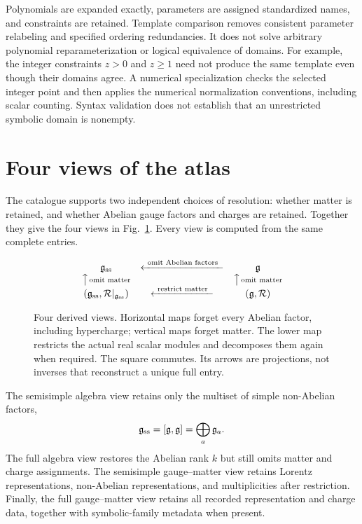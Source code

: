 Polynomials are expanded exactly, parameters are assigned standardized names, and constraints are retained. Template comparison removes consistent parameter relabeling and specified ordering redundancies. It does not solve arbitrary polynomial reparameterization or logical equivalence of domains. For example, the integer constraints $z>0$ and $z\geq1$ need not produce the same template even though their domains agree. A numerical specialization checks the selected integer point and then applies the numerical normalization conventions, including scalar counting. Syntax validation does not establish that an unrestricted symbolic domain is nonempty.

\section{Four views of the atlas}
\label{sec:views}

The catalogue supports two independent choices of resolution: whether matter is retained, and whether Abelian gauge factors and charges are retained. Together they give the four views in Fig.~\ref{fig:views}. Every view is computed from the same complete entries.

\begin{figure}[tb]
\centering
\renewcommand{\arraystretch}{1.7}
\[
\begin{array}{ccc}
\mathfrak{g}_{\mathrm{ss}} & \xleftarrow{\ \text{omit Abelian factors}\ } & \mathfrak g \\
\big\uparrow\!\scriptstyle\text{ omit matter} &&
\big\uparrow\!\scriptstyle\text{ omit matter} \\
(\mathfrak{g}_{\mathrm{ss}},\mathcal R|_{\mathfrak{g}_{\mathrm{ss}}}) &
\xleftarrow{\ \text{restrict matter}\ } & (\mathfrak g,\mathcal R)
\end{array}
\]
\caption{Four derived views. Horizontal maps forget every Abelian factor, including hypercharge; vertical maps forget matter. The lower map restricts the actual real scalar modules and decomposes them again when required. The square commutes. Its arrows are projections, not inverses that reconstruct a unique full entry.}
\label{fig:views}
\end{figure}

The semisimple algebra view retains only the multiset of simple non-Abelian factors,
\begin{equation}
\mathfrak{g}_{\mathrm{ss}}=[\mathfrak g,\mathfrak g]=\bigoplus_a\mathfrak g_a.
\end{equation}
The full algebra view restores the Abelian rank $k$ but still omits matter and charge assignments. The semisimple gauge--matter view retains Lorentz representations, non-Abelian representations, and multiplicities after restriction. Finally, the full gauge--matter view retains all recorded representation and charge data, together with symbolic-family metadata when present.

